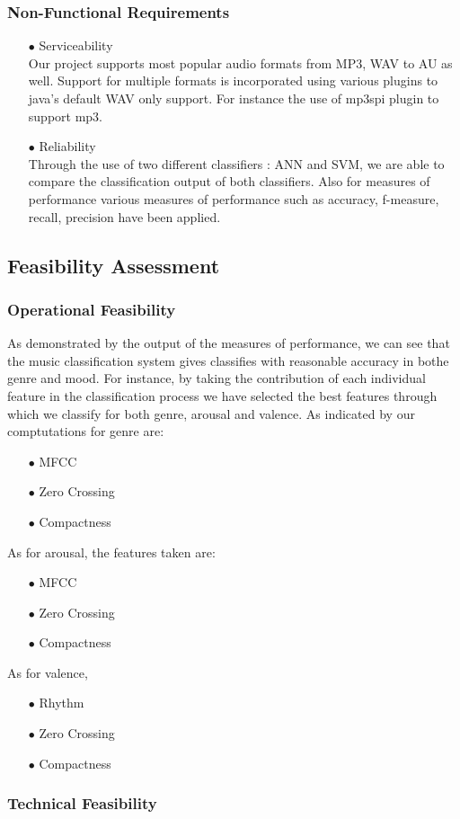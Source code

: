 \subsubsection{Non-Functional Requirements}
    \begin{itemize}
    \item[$\bullet$] Serviceability\\
        Our project supports most popular audio formats from MP3, WAV to AU as well. Support for multiple formats is incorporated using various plugins to java’s default WAV only support. For instance the use of mp3spi plugin to
         support mp3.
    \item[$\bullet$] Reliability\\
        Through the use of two different classifiers : ANN and SVM, we are able to compare the classification output of both classifiers. Also for measures of performance various measures of performance such as
        accuracy, f-measure, recall, precision have been applied.
    \end{itemize}

\subsection{Feasibility Assessment}
\subsubsection{Operational Feasibility}
    As demonstrated by the output of the measures of performance, we can see that the music classification system gives classifies with reasonable accuracy in bothe genre and mood. For instance, by taking the contribution of each
    individual feature in the classification process we have selected the best features through which we classify for both genre, arousal and valence. As indicated by our comptutations for genre are:
    \begin{itemize}
    \item[$\bullet$] MFCC
    \item[$\bullet$] Zero Crossing
    \item[$\bullet$] Compactness
    \end{itemize}
    As for arousal, the features taken are:
    \begin{itemize}
    \item[$\bullet$] MFCC
    \item[$\bullet$] Zero Crossing
    \item[$\bullet$] Compactness
    \end{itemize}
    As for valence,
    \begin{itemize}
    \item[$\bullet$] Rhythm
    \item[$\bullet$] Zero Crossing
    \item[$\bullet$] Compactness
    \end{itemize}
\newpage
\subsubsection{Technical Feasibility}
